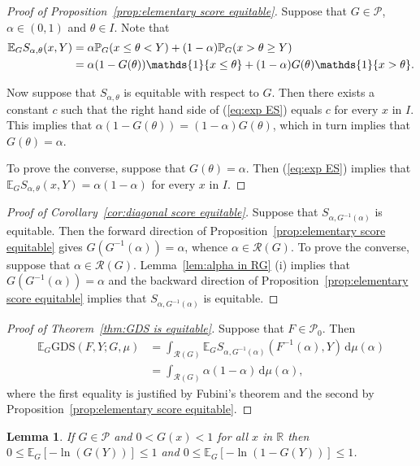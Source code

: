 \documentclass[10pt]{article} %
\theoremstyle{theorem}
\newtheorem{lem}{Lemma}
\theoremstyle{definition}
\newcommand{\RRR}{\mathbb{R}}
\newcommand{\EEE}{\mathbb{E}}
\newcommand{\PPP}{\mathbb{P}}
\newcommand{\dd}{\mathrm{d}}
\newcommand{\one}{\mathds{1}}
\newcommand{\GDS}{\mathrm{GDS}}
\newcommand{\RG}{\mathcal{R}(G)}
\begin{document}
\begin{proof}[Proof of Proposition~\ref{prop:elementary score equitable}]
Suppose that $G\in\mathcal{P}$, $\alpha\in(0,1)$ and $\theta\in I$. Note that
\begin{align}
\EEE_G S_{\alpha,\theta}(x,Y) 
&= \alpha\PPP_G(x\leq \theta<Y) + (1-\alpha)\PPP_G(x> \theta\geq Y) \notag \\
&= \alpha(1-G(\theta))\one\{x \leq \theta\} + (1-\alpha)G(\theta)\one\{x > \theta\}. \label{eq:exp ES}
\end{align}

Now suppose that $S_{\alpha,\theta}$ is equitable with respect to $G$. Then there exists a constant $c$ such that the right hand side of (\ref{eq:exp ES}) equals $c$ for every $x$ in $I$. This implies that $\alpha(1-G(\theta)) =  (1-\alpha)G(\theta)$, which in turn implies that $G(\theta)=\alpha$.

To prove the converse, suppose that $G(\theta)=\alpha$.  Then (\ref{eq:exp ES}) implies that $\EEE_G S_{\alpha,\theta}(x,Y)=\alpha(1-\alpha)$ for every $x$ in $I$.
\end{proof}

\begin{proof}[Proof of Corollary~\ref{cor:diagonal score equitable}]
Suppose that $S_{\alpha,G^{-1}(\alpha)}$ is equitable. Then the forward direction of  Proposition~\ref{prop:elementary score equitable} gives $G(G^{-1}(\alpha))=\alpha$, whence $\alpha\in\RG$. To prove the converse, suppose that $\alpha\in\RG$. Lemma~\ref{lem:alpha in RG} (i) implies that $G(G^{-1}(\alpha))=\alpha$ and the backward direction of Proposition~\ref{prop:elementary score equitable} implies that  $S_{\alpha,G^{-1}(\alpha)}$ is equitable.
\end{proof}

\begin{proof}[Proof of Theorem~\ref{thm:GDS is equitable}]
Suppose that $F\in\mathcal{P}_0$. Then
\begin{align*}
\EEE_G\GDS(F,Y;G,\mu)
&= \int_{\RG} \EEE_G S_{\alpha,G^{-1}(\alpha)}(F^{-1}(\alpha),Y) \, \dd\mu(\alpha) \\
&= \int_{\RG} \alpha(1-\alpha) \, \dd\mu(\alpha),
\end{align*}
where the first equality is justified by Fubini's theorem and the second by Proposition~\ref{prop:elementary score equitable}.
\end{proof}


\begin{lem}\label{lem:finite expectations}
If $G\in\mathcal{P}$ and $0<G(x)<1$ for all $x$ in $\RRR$ then $0\leq \EEE_G[-\ln(G(Y))]\leq 1$ and $0\leq\EEE_G[-\ln(1-G(Y))]\leq 1$.
\end{lem}
\end{document}
